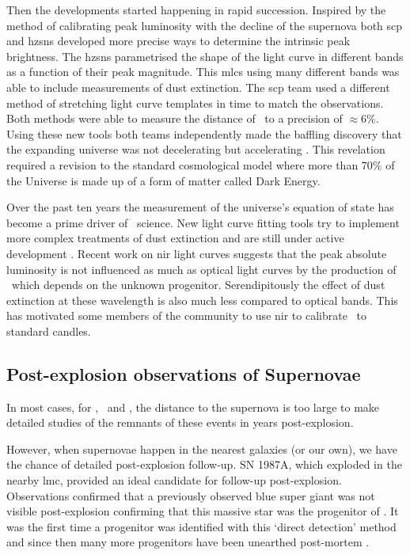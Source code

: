 Then the developments started happening in rapid succession.  Inspired by the method of calibrating peak luminosity with the decline of the supernova both \gls{scp} and \gls{hzsns} developed more precise ways to determine the intrinsic peak brightness. The \gls{hzsns} parametrised the shape of the light curve  in different bands as a function of their peak magnitude. This \gls{mlcs} using many different bands was able to include measurements of dust extinction. The \gls{scp} team used a different method of stretching light curve templates in time to match the observations. Both methods were able to measure the distance of \sneia\ to a precision of $\approx6\%$. Using these new tools both teams independently made the baffling discovery that the expanding universe was not decelerating but accelerating \citep{1998AJ....116.1009R,1999ApJ...517..565P}. This revelation required a revision to the standard cosmological model where more than 70\% of the Universe is made up of a form of matter called Dark Energy.

Over the past ten years the measurement of the universe's equation of state has become a prime driver of \sneia\ science. New light curve fitting tools try to implement more complex treatments of dust extinction and are still under active development \cite[e.g.][]{2007ApJ...659..122J, 2007A&A...466...11G}. Recent work on \gls{nir} light curves \citep{2006ApJ...649..939K} suggests that the peak absolute luminosity is not influenced as much as optical light curves by the production of \Ni\ which depends on the unknown progenitor. Serendipitously the effect of dust extinction at these wavelength is also much less compared to optical bands. This has motivated some members of the community \citep[e.g.][]{2011ApJ...731..120M} to use \gls{nir} to calibrate \sneia\ to standard candles.

\subsection{Post-explosion observations of Supernovae}

In most cases, for \sneia, \sneibc\ and \sneii, the distance to the supernova is too large to make detailed studies of the remnants of these events in years post-explosion.

However, when supernovae happen in the nearest galaxies (or our own), we have the chance of detailed post-explosion follow-up.
SN 1987A, which exploded in the nearby \gls{lmc}, provided an ideal candidate for follow-up post-explosion. Observations confirmed that a previously observed blue super giant was not visible post-explosion \citep{1989A&A...219..229W} confirming that this massive star was the progenitor of . It was the first time a progenitor was identified with this `direct detection' method and since then many more progenitors have been unearthed post-mortem \citep[for a review see][]{2009ARA&A..47...63S}.

